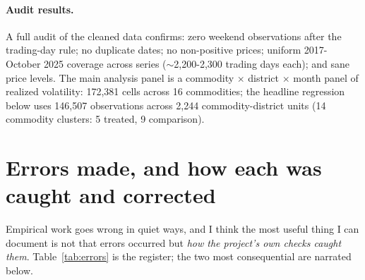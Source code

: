 \documentclass[11pt]{article}
\begin{document}
\paragraph{Audit results.} A full audit of the cleaned data confirms: zero weekend
observations after the trading-day rule; no duplicate dates; no non-positive prices;
uniform 2017-October 2025 coverage across series ($\sim$2{,}200-2{,}300 trading days
each); and sane price levels. The main analysis panel is a commodity $\times$ district
$\times$ month panel of realized volatility: 172{,}381 cells across 16 commodities;
the headline regression below uses 146{,}507 observations across 2{,}244
commodity-district units (14 commodity clusters: 5 treated, 9 comparison).

\section{Errors made, and how each was caught and corrected}
\label{sec:errors}

Empirical work goes wrong in quiet ways, and I think the most useful thing I can document
is not that errors occurred but \emph{how the project's own checks caught them}.
Table~\ref{tab:errors} is the register; the two most consequential are narrated below.
\end{document}
